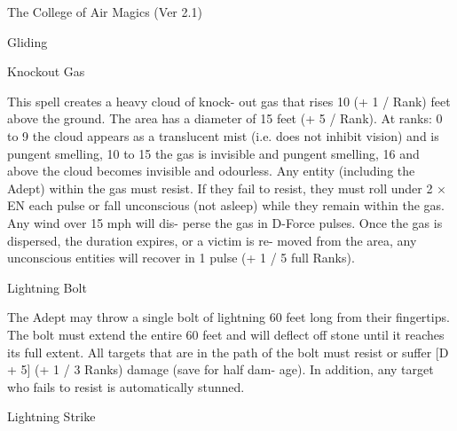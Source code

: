 \begin{Chapter}{The College of Air Magics (Ver 2.1)}
\begin{spell}[S-8]{Gliding }
\begin{effects}
\end{effects}
\end{spell}

\begin{spell}[S-9]{Knockout Gas }

\begin{effects}
This spell creates a heavy cloud of knock-
out  gas  that  rises  10  (+  1  /  Rank)  feet  above  the 
ground.  The  area  has  a  diameter  of  15  feet  (+  5  / 
Rank).  At  ranks:  0  to  9  the  cloud  appears  as  a 
translucent mist (i.e. does not inhibit vision) and is 
pungent smelling, 10 to 15 the gas is invisible and 
pungent smelling, 16 and above the cloud becomes 
invisible  and  odourless.  Any  entity  (including  the 
Adept)  within  the  gas  must  resist.  If  they  fail  to 
resist,  they  must  roll  under  2  ×  EN  each  pulse  or 
fall  unconscious  (not  asleep)  while  they  remain 
within  the  gas.  Any  wind  over  15  mph  will  dis-
perse  the  gas  in  D-Force  pulses.  Once  the  gas  is 
dispersed,  the  duration  expires,  or  a  victim  is  re-
moved from the area, any unconscious entities will 
recover in 1 pulse (+ 1 / 5 full Ranks). 

\end{effects}
\end{spell}

\begin{spell}[S-10]{Lightning Bolt }

\begin{effects}
 The  Adept  may  throw  a  single  bolt  of 
lightning  60  feet  long  from  their  fingertips.  The 
bolt must extend the entire 60 feet and will deflect 
off stone until it reaches its full extent. All targets 
that are in the path of the bolt must resist or suffer 
[D + 5] (+ 1 / 3 Ranks) damage (save for half dam-
age).  In  addition,  any  target  who  fails  to  resist  is 
automatically stunned. 

\end{effects}
\end{spell}

\begin{spell}[S-11]{Lightning Strike }


\end{spell}
\end{Chapter}
